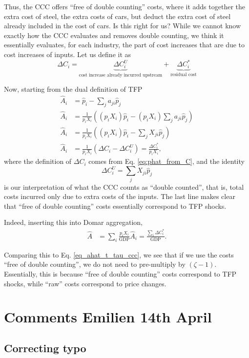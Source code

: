 \documentclass[11pt]{article}
\begin{document}
Thus, the CCC offers ``free of double counting'' costs, where it adds together the extra cost of steel, the extra costs of cars, but deduct the extra cost of steel already included in the cost of cars. Is this right for us? While we cannot know exactly how the CCC evaluates and removes double counting, we think it essentially evaluates, for each industry, the part of cost increases that are due to cost increases of inputs. Let us define it as
\[
\Delta C_{i} = \underbrace{\Delta C^U_{i}}_{\text{cost increase already incurred upstream}} +  \underbrace{\Delta C^*_{i}}_{\text{residual cost}}
\]

Now, starting from the dual definition of TFP
\begin{align}
\label{eq_dual_processed}
\hat{A}_i &= \hat{p}_i - \sum_j a_{ji} \hat{p}_{j} \\
\hat{A}_i &= \frac{1}{p_i X_i} \left( (p_i X_i) \hat{p}_i - (p_i X_i) \sum_j a_{ji} \hat{p}_{j} \right)\\
\hat{A}_i &= \frac{1}{p_i X_i} \left( (p_i X_i)\hat{p}_i - \sum_j X_{ji} \hat{p}_{j}\right)\\
\hat{A}_i &= \frac{1}{p_i X_i} \left( \Delta C_i  - \Delta C_i^{U} \right) = \frac{\Delta C^*_i}{p_i X_i},
\end{align}
where the definition of $\Delta C_i$ comes from Eq. \ref{eq:phat_from_C}, and the identity
\[
\Delta C_i^{U} = \sum_j X_{ji} \hat{p}_{j}
\]
is our interpretation of what the CCC counts as ``double counted'', that is, total costs incurred only due to extra costs of the inputs. The last line makes clear that ``free of double counting'' costs essentially correspond to TFP shocks.

Indeed, inserting this into Domar aggregation,
\begin{align}
\label{eq_ahat_processed_ccc}
\hat{A} &= \sum_i \frac{p_i X_i}{\text{GDP}} \hat{A}_i  = \frac{\sum_i \Delta C^*_i}{\text{GDP}}.
\end{align}

Comparing this to Eq. \ref{eq_ahat_t_tau_ccc}, we see that if we use the costs ``free of double counting'', we do not need to pre-multiply by $(\zeta-1)$. Essentially, this is because ``free of double counting'' costs correspond to TFP shocks, while ``raw'' costs correspond to price changes.


\section{Comments Emilien 14th April}
\subsection{Correcting typo}
\end{document}
